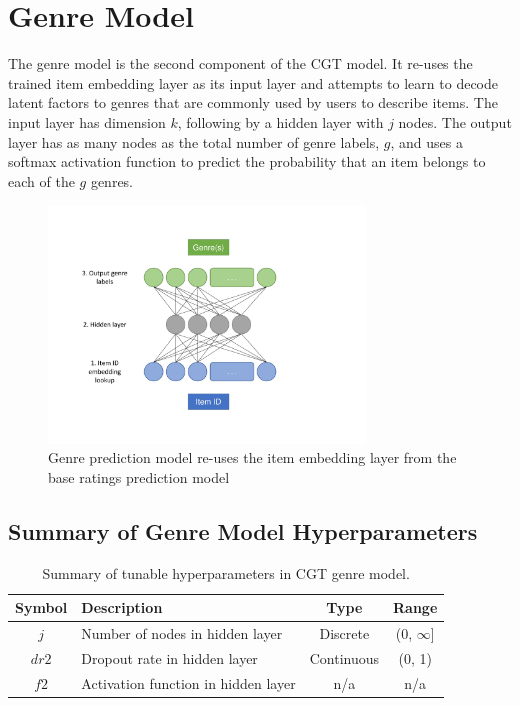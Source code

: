 \section{Genre Model}
The genre model is the second component of the CGT model. It re-uses the trained item embedding layer as its input layer and attempts to learn to decode latent factors to genres that are commonly used by users to describe items. The input layer has dimension $k$, following by a hidden layer with $j$ nodes. The output layer has as many nodes as the total number of genre labels, $g$, and uses a softmax activation function to predict the probability that an item belongs to each of the $g$ genres. 

\begin{figure}[H]
\centering
\includegraphics[width=0.75\textwidth]{Figures/4_genre-model.pdf}
\decoRule
\caption[Genre prediction model]{Genre prediction model re-uses the item embedding layer from the base ratings prediction model}
\label{fig:4_genre-prediction-architecture}
\end{figure}

\subsection{Summary of Genre Model Hyperparameters}
\begin{table}[H]
\centering
\begin{tabular}{c | p{3.5cm} | c | c}
\toprule
\textbf{Symbol} & \textbf{Description} & \textbf{Type} & \textbf{Range} \\
\midrule
$j$ & Number of nodes in hidden layer & Discrete & (0, $\infty$] \\
\midrule
$dr2$ & Dropout rate in hidden layer & Continuous & (0, 1) \\
\midrule
$f2$ & Activation function in hidden layer & n/a & n/a \\
\bottomrule
\end{tabular}
\caption[Genre model hyperparameters]{Summary of tunable hyperparameters in CGT genre model.}
\label{tab:genre-hparams}
\end{table}

